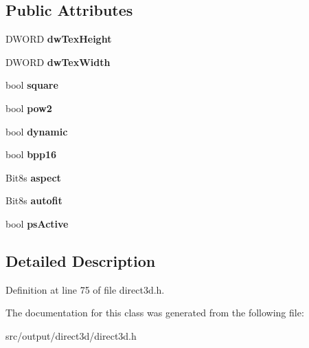 \subsection*{Public Attributes}
\begin{DoxyCompactItemize}
\item 
\hypertarget{classCDirect3D_a9cc53e0233f977505e05ee041f0caa78}{D\-W\-O\-R\-D {\bfseries dw\-Tex\-Height}}\label{classCDirect3D_a9cc53e0233f977505e05ee041f0caa78}

\item 
\hypertarget{classCDirect3D_a496f302fa81d3b230c5f78be2535ffb2}{D\-W\-O\-R\-D {\bfseries dw\-Tex\-Width}}\label{classCDirect3D_a496f302fa81d3b230c5f78be2535ffb2}

\item 
\hypertarget{classCDirect3D_a761f1a50d5d3c161632325c76ad10ea9}{bool {\bfseries square}}\label{classCDirect3D_a761f1a50d5d3c161632325c76ad10ea9}

\item 
\hypertarget{classCDirect3D_a78a14a9db1e8e6a30586bc0e069ecbaf}{bool {\bfseries pow2}}\label{classCDirect3D_a78a14a9db1e8e6a30586bc0e069ecbaf}

\item 
\hypertarget{classCDirect3D_a49900dc75b6079841da7ef707397af35}{bool {\bfseries dynamic}}\label{classCDirect3D_a49900dc75b6079841da7ef707397af35}

\item 
\hypertarget{classCDirect3D_aa9f4499c1c73595ff5faa5472cb247cd}{bool {\bfseries bpp16}}\label{classCDirect3D_aa9f4499c1c73595ff5faa5472cb247cd}

\item 
\hypertarget{classCDirect3D_a667ec11060e1b35a393aed95c134b1c8}{Bit8s {\bfseries aspect}}\label{classCDirect3D_a667ec11060e1b35a393aed95c134b1c8}

\item 
\hypertarget{classCDirect3D_a181bdf0499756c0ca5a300a34477bbe0}{Bit8s {\bfseries autofit}}\label{classCDirect3D_a181bdf0499756c0ca5a300a34477bbe0}

\item 
\hypertarget{classCDirect3D_af269336b17645f85062a82c545cd460a}{bool {\bfseries ps\-Active}}\label{classCDirect3D_af269336b17645f85062a82c545cd460a}

\end{DoxyCompactItemize}


\subsection{Detailed Description}


Definition at line 75 of file direct3d.\-h.



The documentation for this class was generated from the following file\-:\begin{DoxyCompactItemize}
\item 
src/output/direct3d/direct3d.\-h\end{DoxyCompactItemize}
